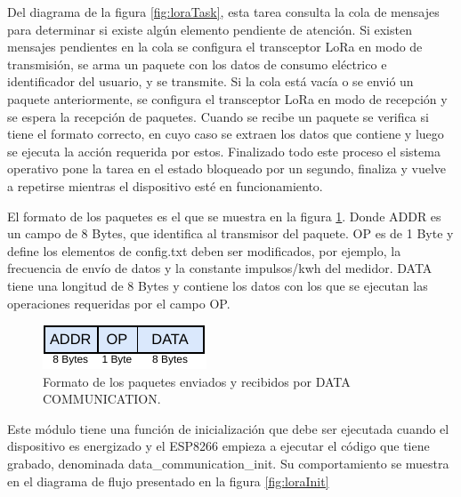Del diagrama de la figura \ref{fig:loraTask}, esta tarea consulta la cola de mensajes para determinar si existe algún elemento pendiente de atención. Si existen mensajes pendientes en la cola se configura el transceptor LoRa en modo de transmisión, se arma un paquete con los datos de consumo eléctrico e identificador del usuario, y se transmite. Si la cola está vacía o se envió un paquete anteriormente, se configura el transceptor LoRa en modo de recepción y se espera la recepción de paquetes. Cuando se recibe un paquete se verifica si tiene el formato correcto, en cuyo caso se extraen los datos que contiene y luego se ejecuta la acción requerida por estos. Finalizado todo este proceso el sistema operativo pone la tarea en el estado bloqueado por un segundo, finaliza y vuelve a repetirse mientras el dispositivo esté en funcionamiento.

El formato de los paquetes es el que se muestra en la figura \ref{fig:loraRxPacket}. Donde ADDR es un campo de 8 Bytes, que identifica al transmisor del paquete. OP es de 1 Byte y define los elementos de config.txt deben ser modificados, por ejemplo, la frecuencia de envío de datos y la constante impulsos/kwh del medidor. DATA tiene una longitud de 8 Bytes y contiene los datos con los que se ejecutan las operaciones requeridas por el campo OP.

\begin{figure}[h]
	\centering
	\includegraphics[scale=1]{./Figures/lora_communication_rx_packet.pdf}
	\caption{Formato de los paquetes enviados y recibidos por DATA COMMUNICATION.}
		\label{fig:loraRxPacket}
\end{figure}

Este módulo tiene una función de inicialización que debe ser ejecutada cuando el dispositivo es energizado y el ESP8266 empieza a ejecutar el código que tiene grabado, denominada data\_communication\_init. Su comportamiento se muestra en el diagrama de flujo presentado en la figura \ref{fig:loraInit}

